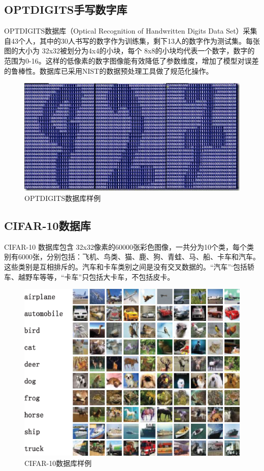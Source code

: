 \documentclass[oneside]{ZJUthesis}
\begin{document}
\subsection{OPTDIGITS手写数字库}
OPTDIGITS数据库（Optical Recognition of Handwritten Digits Data Set）采集自43个人，其中的30人书写的数字作为训练集，剩下13人的数字作为测试集\cite{Bache+Lichman:2013}。每张图的大小为 32x32被划分为4x4的小块，每个 8x8的小块均代表一个数字，数字的范围为0-16。这样的低像素的数字图像能有效降低了参数维度，增加了模型对误差的鲁棒性。数据库已采用NIST的数据预处理工具做了规范化操作。
\begin{figure}[H]
\centering
\includegraphics[scale=0.5]{./Pictures/optdigits-icon.eps}
\caption{OPTDIGITS数据库样例\label{fig:svhn-icon}}
\end{figure}



\subsection{CIFAR-10数据库}
CIFAR-10 数据库包含 32x32像素的60000张彩色图像，一共分为10个类，每个类别有6000张，分别包括：飞机、鸟类、猫、鹿、狗、青蛙、马、船、卡车和汽车\cite{krizhevsky2009learning}。这些类别是互相排斥的。汽车和卡车类别之间是没有交叉数据的。``汽车''‘包括轿车、越野车等等，``卡车''只包括大卡车，不包括皮卡。
\begin{figure}[h]
\centering
\includegraphics[scale=0.7]{./Pictures/cifar-icon.eps}
\caption{CIFAR-10数据库样例\label{fig:cifar-icon}}
\end{figure}
\end{document}
